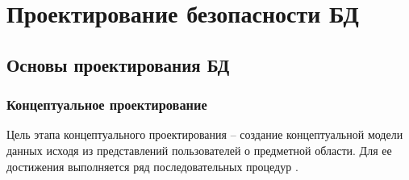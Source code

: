 \section{Проектирование безопасности БД}

\subsection{Основы проектирования БД}

\subsubsection{Концептуальное проектирование}

Цель этапа концептуального проектирования – создание концептуальной модели данных исходя из представлений
пользователей о предметной области. Для ее достижения выполняется ряд последовательных процедур \autocite{oscerko}.
